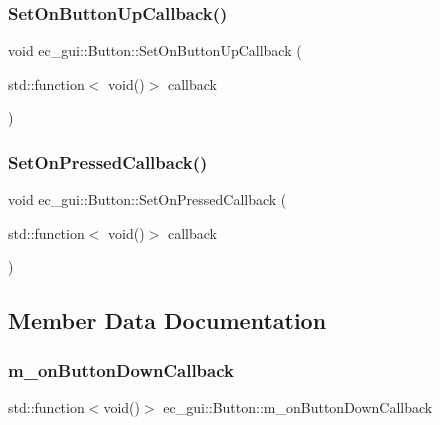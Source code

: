 \subsubsection{\texorpdfstring{Set\+On\+Button\+Up\+Callback()}{SetOnButtonUpCallback()}}
{\footnotesize\ttfamily void ec\+\_\+gui\+::\+Button\+::\+Set\+On\+Button\+Up\+Callback (\begin{DoxyParamCaption}\item[{std\+::function$<$ void()$>$}]{callback }\end{DoxyParamCaption})}

\mbox{\label{classec__gui_1_1_button_a81c99c46bc9f747cdacdafa813f6974e}} 
\subsubsection{\texorpdfstring{Set\+On\+Pressed\+Callback()}{SetOnPressedCallback()}}
{\footnotesize\ttfamily void ec\+\_\+gui\+::\+Button\+::\+Set\+On\+Pressed\+Callback (\begin{DoxyParamCaption}\item[{std\+::function$<$ void()$>$}]{callback }\end{DoxyParamCaption})}



\subsection{Member Data Documentation}
\mbox{\label{classec__gui_1_1_button_a64f82706542dbeb39b5b0db328040bce}} 
\subsubsection{\texorpdfstring{m\+\_\+on\+Button\+Down\+Callback}{m\_onButtonDownCallback}}
{\footnotesize\ttfamily std\+::function$<$void()$>$ ec\+\_\+gui\+::\+Button\+::m\+\_\+on\+Button\+Down\+Callback\hspace{0.3cm}{\ttfamily [protected]}}


